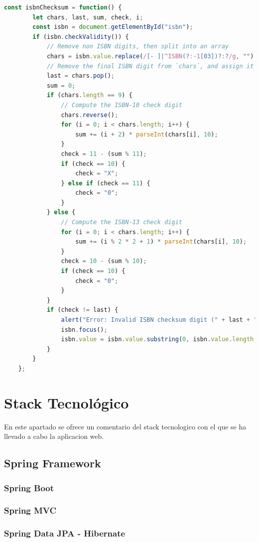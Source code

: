 \documentclass[a4paper]{report}
\begin{document}
    \begin{lstlisting}[language=JavaScript,caption=Validación del dígito de control del ISBN en cliente]
    const isbnChecksum = function() {
    	let chars, last, sum, check, i;
    	const isbn = document.getElementById("isbn");
    	if (isbn.checkValidity()) {
    		// Remove non ISBN digits, then split into an array
    		chars = isbn.value.replace(/[- ]|^ISBN(?:-1[03])?:?/g, "").split("");
    		// Remove the final ISBN digit from `chars`, and assign it to `last`
    		last = chars.pop();
    		sum = 0;
    		if (chars.length == 9) {
    			// Compute the ISBN-10 check digit
    			chars.reverse();
    			for (i = 0; i < chars.length; i++) {
    				sum += (i + 2) * parseInt(chars[i], 10);
    			}
    			check = 11 - (sum % 11);
    			if (check == 10) {
    				check = "X";
    			} else if (check == 11) {
    				check = "0";
    			}
    		} else {
    			// Compute the ISBN-13 check digit
    			for (i = 0; i < chars.length; i++) {
    				sum += (i % 2 * 2 + 1) * parseInt(chars[i], 10);
    			}
    			check = 10 - (sum % 10);
    			if (check == 10) {
    				check = "0";
    			}
    		}
    		if (check != last) {
    			alert("Error: Invalid ISBN checksum digit (" + last + "). Try with (" + check + ")");
    			isbn.focus();
    			isbn.value = isbn.value.substring(0, isbn.value.length - 1);
    		}
    	}
    };
    \end{lstlisting}
    
    
    
    
    

    \section{Stack Tecnológico}
    En este apartado se ofrece un comentario del stack tecnologico con el que se ha llevado a cabo la aplicacion web.

    \subsection{Spring Framework}
    \subsubsection{Spring Boot}
    \subsubsection{Spring MVC}
    \subsubsection{Spring Data JPA - Hibernate}
\end{document}
